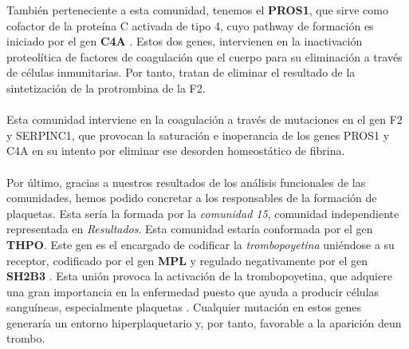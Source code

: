 También perteneciente a esta comunidad, tenemos el \textbf{PROS1}, que sirve como cofactor de la proteína C activada de tipo 4, cuyo pathway de formación es iniciado por el gen \textbf{C4A} \cite{PROS1}. Estos dos genes, intervienen en la inactivación proteolítica de factores de coagulación que el cuerpo para su eliminación a través de células inmunitarias. Por tanto, tratan de eliminar el resultado de la sintetización de la protrombina de la F2.\\\\ Esta comunidad interviene en la coagulación a través de mutaciones en el gen F2 y SERPINC1, que provocan la saturación e inoperancia de los genes PROS1 y C4A en su intento por eliminar ese desorden homeostático de fibrina.\\\\
Por último, gracias a nuestros resultados de los análisis funcionales de las comunidades, hemos podido concretar a los responsables de la formación de plaquetas. Esta sería la formada por la \textit{comunidad 15}, comunidad independiente representada en \textit{Resultados}. Esta comunidad estaría conformada por el gen \textbf{THPO}. Este gen es el encargado de codificar la \textit{trombopoyetina} uniéndose a su receptor\cite{THPO_MPL}, codificado por el gen \textbf{MPL} \cite{THPO_MPL} y regulado negativamente por el gen \textbf{SH2B3} \cite{THPO_MPL}. Esta unión provoca la activación de la trombopoyetina, que adquiere una gran importancia en la enfermedad puesto que ayuda a producir células sanguíneas, especialmente plaquetas \cite{THPO_MPL}. Cualquier mutación en estos genes generaría un entorno hiperplaquetario y, por tanto, favorable a la aparición deun trombo.


